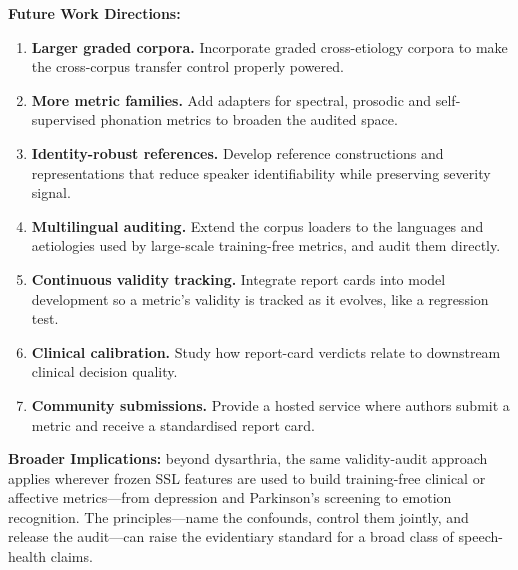 \documentclass[runningheads]{llncs}
\begin{document}
\textbf{Future Work Directions:}
\begin{enumerate}
\item \textbf{Larger graded corpora.} Incorporate graded cross-etiology corpora to make
the cross-corpus transfer control properly powered.
\item \textbf{More metric families.} Add adapters for spectral, prosodic and
self-supervised phonation metrics to broaden the audited space.
\item \textbf{Identity-robust references.} Develop reference constructions and
representations that reduce speaker identifiability while preserving severity signal.
\item \textbf{Multilingual auditing.} Extend the corpus loaders to the languages and
aetiologies used by large-scale training-free metrics, and audit them directly.
\item \textbf{Continuous validity tracking.} Integrate report cards into model
development so a metric's validity is tracked as it evolves, like a regression test.
\item \textbf{Clinical calibration.} Study how report-card verdicts relate to
downstream clinical decision quality.
\item \textbf{Community submissions.} Provide a hosted service where authors submit a
metric and receive a standardised report card.
\end{enumerate}

\textbf{Broader Implications:} beyond dysarthria, the same validity-audit approach applies
wherever frozen SSL features are used to build training-free clinical or affective
metrics---from depression and Parkinson's screening to emotion recognition. The
principles---name the confounds, control them jointly, and release the audit---can raise
the evidentiary standard for a broad class of speech-health claims.
\end{document}
